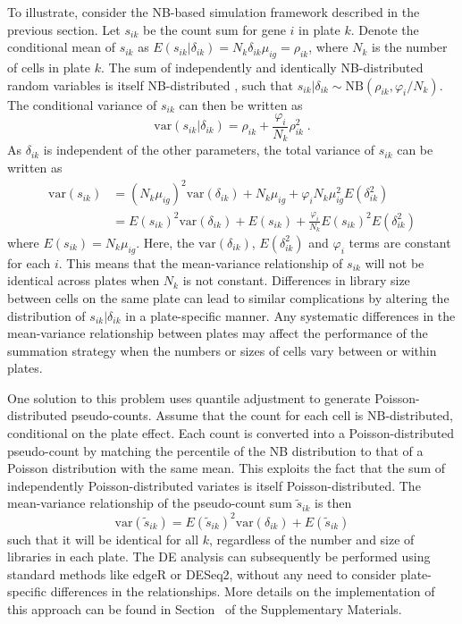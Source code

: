 \documentclass[oupdraft]{bio}
\begin{document}
To illustrate, consider the NB-based simulation framework described in the previous section.
Let $s_{ik}$ be the count sum for gene $i$ in plate $k$.
Denote the conditional mean of $s_{ik}$ as $E(s_{ik}|\delta_{ik})=N_k \delta_{ik}\mu_{ig} = \rho_{ik}$, where $N_k$ is the number of cells in plate $k$.
The sum of independently and identically NB-distributed random variables is itself NB-distributed \citep{robinson2008small}, 
    such that $s_{ik} |\delta_{ik} \sim \mbox{NB}(\rho_{ik}, \varphi_{i}/N_k)$.
The conditional variance of $s_{ik}$ can then be written as
\[
    \mbox{var}(s_{ik} |\delta_{ik}) = \rho_{ik} + \frac{\varphi_{i}}{N_k}\rho_{ik}^2 \;.
\]
As $\delta_{ik}$ is independent of the other parameters, the total variance of $s_{ik}$ can be written as
\begin{align*}
    \mbox{var}(s_{ik}) &= (N_k\mu_{ig})^2\mbox{var}(\delta_{ik}) + N_k\mu_{ig} + \varphi_{i} N_k\mu_{ig}^2 E(\delta_{ik}^2) \nonumber \\ 
                       &= E(s_{ik})^2 \mbox{var}(\delta_{ik}) + E(s_{ik}) + \frac{\varphi_{i}}{N_k} E(s_{ik})^2 E(\delta_{ik}^2) 
\end{align*}
where $E(s_{ik})=N_k\mu_{ig}$. 
Here, the $\mbox{var}(\delta_{ik})$, $E(\delta_{ik}^2)$ and $\varphi_{i}$ terms are constant for each $i$.
This means that the mean-variance relationship of $s_{ik}$ will not be identical across plates when $N_k$ is not constant.
Differences in library size between cells on the same plate can lead to similar complications by altering the distribution of $s_{ik} |\delta_{ik}$ in a plate-specific manner.
Any systematic differences in the mean-variance relationship between plates may affect the performance of the summation strategy when the numbers or sizes of cells vary between or within plates.

One solution to this problem uses quantile adjustment \citep{robinson2008small} to generate Poisson-distributed pseudo-counts.
Assume that the count for each cell is NB-distributed, conditional on the plate effect.
Each count is converted into a Poisson-distributed pseudo-count by matching the percentile of the NB distribution to that of a Poisson distribution with the same mean.
This exploits the fact that the sum of independently Poisson-distributed variates is itself Poisson-distributed.
The mean-variance relationship of the pseudo-count sum $\tilde{s}_{ik}$ is then
\[
    \mbox{var}(\tilde{s}_{ik}) = E(\tilde{s}_{ik})^2 \mbox{var}(\delta_{ik}) + E(\tilde{s}_{ik}) 
\]
such that it will be identical for all $k$, regardless of the number and size of libraries in each plate.
The DE analysis can subsequently be performed using standard methods like edgeR or DESeq2, without any need to consider plate-specific differences in the relationships.
More details on the implementation of this approach can be found in Section~\suppquantile{} of the Supplementary Materials.
\end{document}
